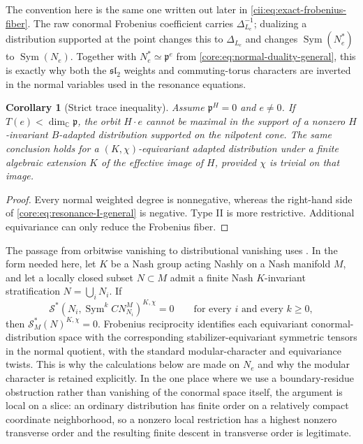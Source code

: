 \documentclass[11pt,reqno]{amsart}
\numberwithin{equation}{section}
\newtheorem{corollary}[theorem]{Corollary}
\theoremstyle{definition}
\theoremstyle{remark}
\newcommand{\C}{\mathbb C}
\newcommand{\Sym}{\operatorname{Sym}}
\newcommand{\fp}{\mathfrak p}
\newcommand{\cS}{\mathcal S}
\begin{document}
The convention here is the same one written out later in
\eqref{cii:eq:exact-frobenius-fiber}.  The raw conormal Frobenius coefficient
carries $\Delta_{L_e}^{-1}$; dualizing a distribution supported at the point
changes this to $\Delta_{L_e}$ and changes $\Sym(N_e^*)$ to $\Sym(N_e)$.
Together with $N_e^*\simeq\fp^e$ from
\eqref{core:eq:normal-duality-general}, this is exactly why both the
$\mathfrak{sl}_2$ weights and commuting-torus characters are inverted in the
normal variables used in the resonance equations.

\begin{corollary}[Strict trace inequality]\label{core:cor:strict-trace}
Assume $\fp^H=0$ and $e\ne0$.  If $T(e)<\dim_{\C}\fp$, the orbit $H\cdot e$ cannot be
maximal in the support of a nonzero $H$-invariant $B$-adapted distribution
supported on the nilpotent cone.  The same conclusion holds for a
$(K,\chi)$-equivariant adapted distribution under a finite algebraic extension
$K$ of the effective image of $H$, provided $\chi$ is trivial on that image.
\end{corollary}

\begin{proof}
Every normal weighted degree is nonnegative, whereas the right-hand side of
\eqref{core:eq:resonance-I-general} is negative.  Type II is more restrictive.
Additional equivariance can only reduce the Frobenius fiber.
\end{proof}

The passage from orbitwise vanishing to distributional vanishing uses
\cite[Theorem~2.5.6]{AG09}.  In the form needed here, let $K$ be a Nash group
acting Nashly on a Nash manifold $M$, and let a locally closed subset
$N\subset M$ admit a finite Nash $K$-invariant stratification
$N=\bigcup_iN_i$.  If
\[
 \cS^*\!\left(N_i,\Sym^k CN_{N_i}^{M}\right)^{K,\chi}=0
 \qquad\text{for every }i\text{ and every }k\ge0,
\]
then $\cS_M^*(N)^{K,\chi}=0$.  Frobenius reciprocity
\cite[Theorem~2.5.7]{AG09} identifies each equivariant conormal-distribution
space with the corresponding stabilizer-equivariant symmetric tensors in the
normal quotient, with the standard modular-character and equivariance twists.
This is why the calculations below are made on $N_e$ and why the modular
character is retained explicitly.  In the one place where
we use a boundary-residue obstruction rather than vanishing of the conormal
space itself, the argument is local on a slice: an ordinary distribution has
finite order on a relatively compact coordinate neighborhood, so a nonzero
local restriction has a highest nonzero transverse order and the resulting
finite descent in transverse order is legitimate.
\end{document}
